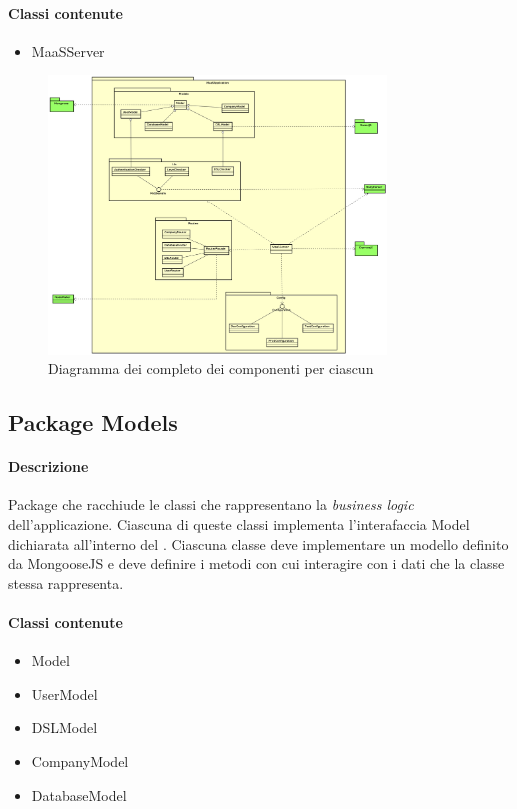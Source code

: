 \paragraph*{Classi contenute}
\begin{itemize}
\item MaaSServer
\end{itemize}

\begin{figure}[H]
\centering
\includegraphics[width=0.8\textwidth]{res/sections/backend/collegamenti.png}
\caption{Diagramma dei  completo dei componenti per ciascun }
\end{figure}

\subsection{Package Models}
\paragraph*{Descrizione}
Package che racchiude le classi che rappresentano la \textit{business logic} dell'applicazione. Ciascuna di queste classi implementa l'interafaccia Model dichiarata all'interno del .
Ciascuna classe deve implementare un modello definito da MongooseJS e deve definire i metodi con cui interagire con i dati che la classe stessa rappresenta. \\

\paragraph*{Classi contenute}
\begin{itemize}
\item Model
\item UserModel
\item DSLModel
\item CompanyModel
\item DatabaseModel
\end{itemize}

